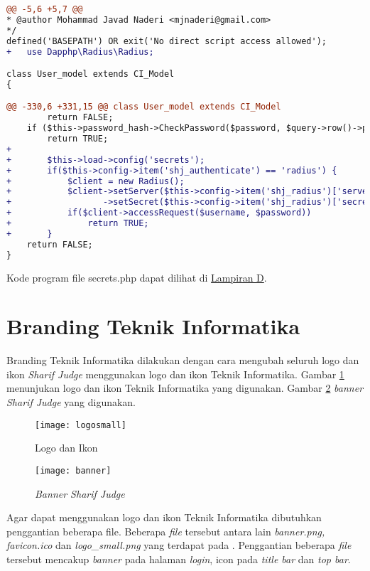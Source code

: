\begin{lstlisting}[language=diff, caption=Perubahan kode program pada \textit{User\_model.php}, label=lst:26, basicstyle=\ttfamily, frame=single,
columns=fullflexible, keepspaces=true, breaklines=true]
@@ -5,6 +5,7 @@
* @author Mohammad Javad Naderi <mjnaderi@gmail.com>
*/
defined('BASEPATH') OR exit('No direct script access allowed');
+   use Dapphp\Radius\Radius;

class User_model extends CI_Model
{

@@ -330,6 +331,15 @@ class User_model extends CI_Model
		return FALSE;
	if ($this->password_hash->CheckPassword($password, $query->row()->password))
		return TRUE;
+  
+   	$this->load->config('secrets');
+       if($this->config->item('shj_authenticate') == 'radius') {
+       	$client = new Radius();
+           $client->setServer($this->config->item('shj_radius')['server']) // RADIUS server address
+                  ->setSecret($this->config->item('shj_radius')['secret']);
+           if($client->accessRequest($username, $password))
+           	return TRUE;
+       }
	return FALSE;
}
\end{lstlisting}

Kode program file secrets.php dapat dilihat di \hyperref[lamp:kodeprogramsecrets]{Lampiran D}.

\section{Branding Teknik Informatika}
Branding Teknik Informatika dilakukan dengan cara mengubah seluruh logo dan ikon \textit{Sharif Judge} menggunakan logo dan ikon Teknik Informatika. Gambar \ref{fig:logosmall} menunjukan logo dan ikon Teknik Informatika yang digunakan. Gambar \ref{fig:banner} \textit{banner Sharif Judge} yang digunakan.

\begin{figure}[H]
	\centering  
	\texttt{[image: logosmall]}  
	\caption[Logo dan Ikon]{Logo dan Ikon} 
	\label{fig:logosmall} 
\end{figure} 

\begin{figure}[H]
	\centering  
	\texttt{[image: banner]}  
	\caption[\textit{Banner Sharif Judge}]{\textit{Banner Sharif Judge}} 
	\label{fig:banner} 
\end{figure} 

Agar dapat menggunakan logo dan ikon Teknik Informatika dibutuhkan penggantian beberapa file. Beberapa \textit{file} tersebut antara lain \textit{banner.png, favicon.ico} dan \textit{logo\_small.png} yang terdapat pada . Penggantian beberapa \textit{file} tersebut mencakup \textit{banner} pada halaman \textit{login}, icon pada \textit{title bar} dan \textit{top bar}.

